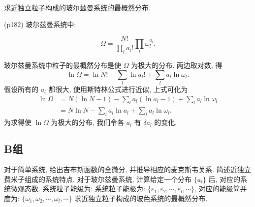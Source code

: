\begin{questions}
  \question 求近独立粒子构成的玻尔兹曼系统的最概然分布.
  \begin{solution}
    (p182) 玻尔兹曼系统中:

    \begin{equation}
      \label{eq:5}
      \Omega = \frac{N!}{\prod_l a_l !} \prod_l \omega_l^{a_l}.
    \end{equation}

    玻尔兹曼系统中粒子的最概然分布是使 $\Omega$ 为极大的分布. 两边取对数, 得
    \begin{equation}
      \label{eq:6}
      \ln \Omega = \ln N! - \sum_l\ln a_l! + \sum_l a_l \ln \omega_l.
    \end{equation}
    假设所有的 $a_l$ 都很大, 使用斯特林公式进行近似, 上式可化为
    \begin{align}
      \label{eq:7}
      \ln\Omega & = N(\ln N - 1) - \sum_l a_l(\ln a_l - 1) + \sum_l a_l \ln\omega_l \\
                & = N\ln N - \sum_l a_l \ln a_l + \sum_l a_l \ln \omega_l.
    \end{align}
    为求得使 $\ln\Omega$ 为极大的分布, 我们令各 $a_l$ 有 $\delta a_l$ 的变化,


  \end{solution}
\end{questions}

\subsection{B组}
\begin{questions}
  \question 对于简单系统, 给出吉布斯函数的全微分, 并推导相应的麦克斯韦关系.
  \question 简述近独立费米子组成的系统特点.
  \question 对于玻尔兹曼系统, 计算给定一个分布 $ \{a_l \}$ 后, 对应的系统微观态数. 系统粒子能级为: 系统粒子能极为: $\{\varepsilon_1, \varepsilon_2, \cdots, \varepsilon_l, \cdots\}$, 对应的能级简并度为: $ \{ \omega_1, \omega_2, \cdots, \omega_l, \cdots  \}$
  \question 求近独立粒子构成的玻色系统的最概然分布.
\end{questions}
